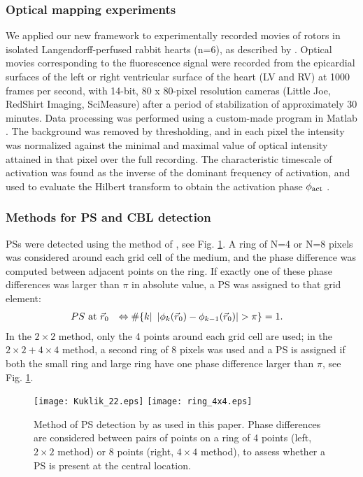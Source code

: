\documentclass{article}
\newcommand{\phiact}{\ensuremath{\phi_{\rm act}}}
\begin{document}
\subsubsection{Optical mapping experiments} \label{sec:opticalmappingmethods} 

We applied our new framework to experimentally recorded movies of rotors in isolated Langendorff-perfused rabbit hearts (n=6), as described by \cite{Kulkarni:2018}. Optical movies corresponding
to the fluorescence signal were recorded from
the epicardial surfaces of the left or right ventricular surface of the heart (LV
and RV) at 1000 frames per second, with 14-bit,
80 x 80-pixel resolution cameras (Little Joe, RedShirt
Imaging, SciMeasure) after a period of stabilization of
approximately 30 minutes.  Data processing was performed using a custom-made program in Matlab \cite{matlab:2020}. The background was removed by thresholding, and in each pixel the intensity was normalized against the minimal and maximal value of optical intensity attained in that pixel over the full recording. The characteristic timescale of activation was found as the inverse of the  dominant frequency of activation, and used to evaluate the Hilbert transform to obtain the activation phase $\phiact$ \citep{Bray:2002}. 

\subsubsection{Methods for PS and CBL detection} \label{sec:PDLmethods} 

PSs were detected using the method of \cite{Kuklik:2017}, see Fig. \ref{fig:PSdetection}. A ring of N=4 or N=8 pixels was considered around each grid cell of the medium, and the phase difference was computed between adjacent points on the ring. If exactly one of these phase differences was larger than $\pi$ in absolute value, a PS was assigned to that grid element:
\begin{align}
PS\ \rm{at}&\  \vec{r}_0    &\Leftrightarrow   \# \{ k |\   \left| \phi_k(\vec{r}_0) - \phi_{k-1}(\vec{r}_0) \right| > \pi \} &=1. 
\end{align}
In the $2\times 2$ method, only the 4 points around each grid cell are used; in the $2\times 2 + 4 \times 4$ method, a second ring of 8 pixels was used and a PS is assigned if both the small ring and large ring have one phase difference larger than $\pi$, see Fig. \ref{fig:PSdetection}.  

\begin{figure}
    \centering
    \texttt{[image: Kuklik\_22.eps]}
    \texttt{[image: ring\_4x4.eps]}
    \caption{Method of PS detection by \cite{Kuklik:2017} as used in this paper. Phase differences are considered between pairs of points on a ring of 4 points (left, $2\times 2$ method) or 8 points (right, $4\times 4$ method), to assess whether a PS is present at the central location. }
    \label{fig:PSdetection}
\end{figure}
    
\end{document}
